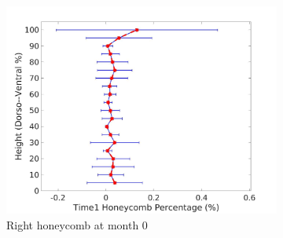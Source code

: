 \begin{figure}[H]
\begin{subfigure}{.42\linewidth}
  \includegraphics[width=\linewidth,trim={{.0\wd0} {.0\wd0} {.0\wd0} {.0\wd0}},clip]{QuantitativeAnalysis/Image/RightLungHoneycombDiseaseDorsoToVentralTime1.jpg}
  \caption{Right honeycomb at month 0}
  \label{fig:DiseaseDorsoToVentralTime1-f}
\end{subfigure}
\begin{subfigure}{.42\linewidth}%

\end{subfigure}
\end{figure}
